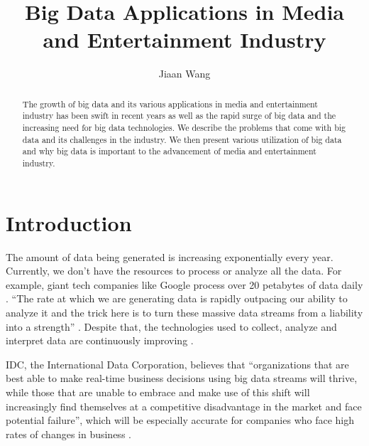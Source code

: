 \title{Big Data Applications in Media and Entertainment Industry}


\author{Jiaan Wang}


\begin{abstract}

    The growth of big data and its various applications in media and entertainment 
    industry has been swift in recent years as well as the rapid surge of big data 
    and the increasing need for big data technologies. We describe the problems 
    that come with big data and its challenges in the industry. We then present 
    various utilization of big data and why big data is important to the advancement 
    of media and entertainment industry. 
    
\end{abstract}


\maketitle

\section{Introduction}

The amount of data being generated is increasing exponentially every year. Currently, we don't have the resources to process or analyze all the data. For example, giant tech companies like Google process over 20 petabytes of data daily \cite{Schlieski2012data}. ``The rate at which we are generating data is rapidly outpacing our ability to analyze it and the trick here is to turn these massive data streams from a liability into a strength'' \cite{Browning2015laptop}. Despite that, the technologies used to collect, analyze and interpret data are continuously improving \cite{Schlieski2012data}.

IDC, the International Data Corporation, believes that ``organizations that are best able to make real-time business decisions using big data streams will thrive, while those that are unable to embrace and make use of this shift will increasingly find themselves at a competitive disadvantage in the market and face potential failure'', which will be especially accurate for companies who face high rates of changes in business \cite{Villars2011care}.


